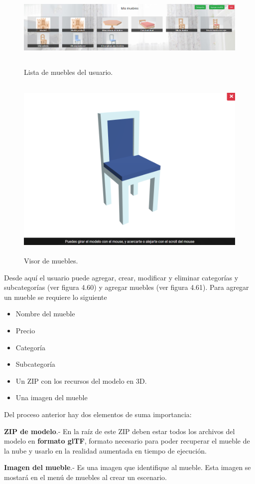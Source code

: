 \begin{figure}[hbt!]
	\centering
	\includegraphics[width=17cm,height=4cm]{imagenes/desarrollo/app/WEB_FURNITURES.png}
	\caption{Lista de muebles del usuario.}
	\label{fig:weblogin}
\end{figure}
\begin{figure}[hbt!]
	\centering
	\includegraphics[width=15cm,height=9cm]{imagenes/desarrollo/app/WEB_MODEL.png}
	\caption{Visor de muebles.}
	\label{fig:webviewer}
\end{figure}

Desde aquí el usuario puede agregar, crear, modificar y eliminar categorías y subcategorías (ver figura 4.60) y agregar muebles (ver figura 4.61). Para agregar un mueble se requiere lo siguiente
\begin{itemize}
	\item Nombre del mueble
	\item Precio
	\item Categoría
	\item Subcategoría
	\item Un ZIP con los recursos del modelo en 3D.
	\item Una imagen del  mueble
\end{itemize}
Del proceso anterior hay dos elementos de suma importancia:\par
\textbf{ZIP de modelo}.- En la raíz de este ZIP deben estar todos los archivos del modelo en \textbf{formato glTF}, formato necesario para poder recuperar el mueble de la nube y usarlo en la realidad aumentada en tiempo de ejecución. \par
\textbf{Imagen del mueble}.- Es una imagen que identifique al mueble. Esta imagen se mostará en el menú de muebles al crear un escenario.\par



